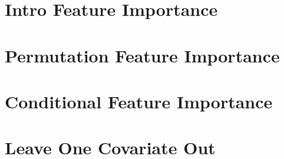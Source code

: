 \documentclass[11pt,compress,t,n
otes=noshow, aspectratio=169, xcolor=table]{beamer}
\begin{document}



% 
% 
% 

\section{Intro Feature Importance}


\section{Permutation Feature Importance}



\section{Conditional Feature Importance}


\section{Leave One Covariate Out}

\end{document}
